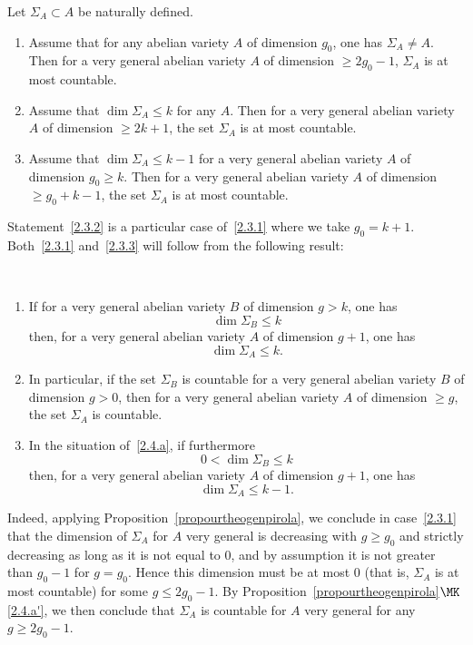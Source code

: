 \begin{theo} \label{thegenpirola}
Let $\Sigma_A\subset A$ be naturally defined.
\begin{enumerate}
\item \label{2.3.1} Assume that for any abelian variety $A$ of dimension $g_0$, one has $\Sigma_A\not=A$. Then for a very general abelian variety $A$ of dimension $\geq 2g_0-1$, $\Sigma_A$ is at most countable.

\item \label{2.3.2} Assume that $\dim \Sigma_A\leq k$ for any $A$. Then for a very general abelian variety $A$ of dimension $\geq 2k+1$, the set $\Sigma_A$ is at most countable.

\item \label{2.3.3} Assume that $\dim \Sigma_A\leq k-1$ for a very general abelian variety $A$ of dimension $g_0\geq k$. Then for a very general abelian variety $A$ of dimension $\geq g_0+k-1$, the set $\Sigma_A$ is at most countable.
\end{enumerate}
\end{theo}

Statement~\eqref{2.3.2} is a particular case of~\eqref{2.3.1} where we take $g_0=k+1$. Both~\eqref{2.3.1} and~\eqref{2.3.3} will follow from the following result:

\begin{propc}\ \label{propourtheogenpirola}
\begin{enumerate}
\renewcommand{\theenumi}{a}
\item \label{2.4.a}
If for a very general abelian variety $B$ of dimension $g> k$, one has
\[
\dim \Sigma_B\leq k
\]
then, for a very general abelian variety $A$ of dimension $g+1$, one has
\[
\dim \Sigma_A\leq k.
\]

\renewcommand{\theenumi}{a$'$}
\item \label{2.4.a'}
In particular, if the set $\Sigma_B$ is countable for a very general abelian variety $B$ of dimension $g>0$, then for a very general abelian variety $A$ of dimension $\geq g$, the set $\Sigma_A$ is countable.

\renewcommand{\theenumi}{b}
\item \label{2.4.b}
In the situation of~\eqref{2.4.a}, if furthermore
\[
0<\dim \Sigma_B\leq k
\]
then, for a very general abelian variety $A$ of dimension $g+1$, one has
\[
\dim \Sigma_A\leq k-1.
\]
\end{enumerate}
\end{propc}

Indeed, applying Proposition~\ref{propourtheogenpirola}, we conclude in case~\eqref{2.3.1} that the dimension of $\Sigma_A$ for $A$ very general is decreasing with $g\geq g_0$ and strictly decreasing as long as it is not equal to $0$, and by assumption it is not greater than $g_0-1$ for $g=g_0$. Hence this dimension must be at most $0$ (that is, $\Sigma_A$ is at most countable) for some $g\leq 2g_0-1$. By Proposition~\ref{propourtheogenpirola}$\MK$\eqref{2.4.a'}, we then conclude that $\Sigma_A$ is countable for $A$ very general for any $g\geq 2g_0-1$.

